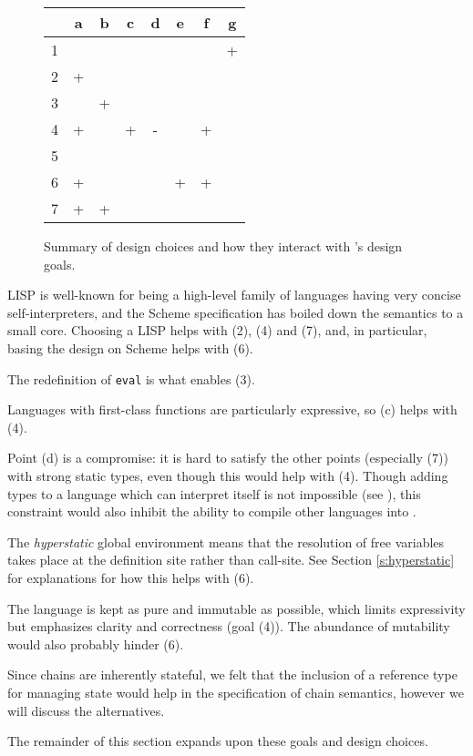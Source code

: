 \begin{figure}[H]
\small
\begin{tabular}{l|ccccccc}
    & a & b & c & d & e & f & g\\
  \hline
  1 &   &   &   &   &   &   & + \\
  2 & + &   &   &   &   &   & \\
  3 &   & +\\
  4 & + &   & + & - &   & +\\
  5 & \\
  6 & + &   &   &   & + & +\\
  7 & + & +\\
\end{tabular}
\normalsize
\caption{Summary of design choices and how they interact with \rad{}'s design goals.}
\end{figure}

LISP is well-known for being a high-level family of languages having very concise
self-interpreters, and the Scheme specification has boiled down the
semantics to a small core. Choosing a LISP helps with (2), (4) and (7), and, in
particular, basing the design on Scheme helps with (6).

The redefinition of \texttt{eval} is what enables (3).

Languages with first-class functions are particularly expressive, so (c) helps
with (4).


Point (d) is a compromise: it is hard to satisfy the other points (especially
(7)) with strong static types, even though this would help with (4). Though
adding types to a language which can interpret itself is not impossible (see
\cite{brown-papers}), this constraint would also inhibit the ability to
compile other languages into \rad{}.

The \emph{hyperstatic} global environment means that the resolution of free
variables takes place at the definition site rather than call-site. See Section
\ref{s:hyperstatic} for explanations for how this helps with (6).

The language is kept as pure and immutable as possible, which limits
expressivity but emphasizes clarity and correctness (goal (4)). The abundance of
mutability would also probably hinder (6).

Since chains are inherently stateful, we felt that the inclusion of a reference
type for managing state would help in the specification of chain semantics, however
we will discuss the alternatives.

The remainder of this section expands upon these goals and
design choices.


